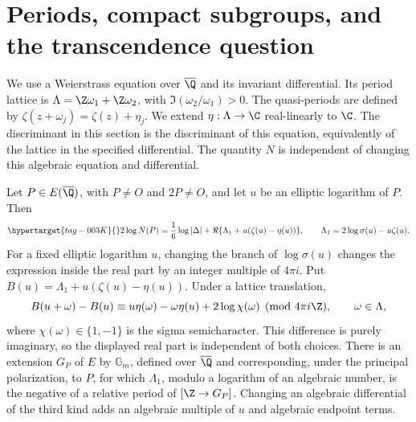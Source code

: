 \section{Periods, compact subgroups, and the transcendence question}

We use a Weierstrass equation over $\overline\Q$ and its invariant
differential. Its period lattice is $\Lambda=\Z\omega_1+\Z\omega_2$,
with $\Im(\omega_2/\omega_1)>0$. The quasi-periods are defined by
$\zeta(z+\omega_j)=\zeta(z)+\eta_j$. We extend
$\eta:\Lambda\to\C$ real-linearly to $\C$. The discriminant in
this section is the discriminant of this equation, equivalently of
the lattice in the specified differential. The quantity $N$ is
independent of changing this algebraic equation and differential.

\begin{proposition}\hypertarget{tag-0017}{}\label{ari:C.7.1}\hypertarget{tag-IA01}{}\label{ari:C.7.1:lift-transport}

Let $P\in E(\overline\Q)$, with $P\ne O$ and $2P\ne O$, and
let $u$ be an elliptic logarithm of $P$. Then
\begin{equation}\hypertarget{tag-003K}{}\label{ari:eq:cp-sigma}
 2\log N(P)=\frac16\log|\Delta|
       +\Re\{\Lambda_1+u(\zeta(u)-\eta(u))\},
 \qquad \Lambda_1=2\log\sigma(u)-u\zeta(u).
\end{equation}
For a fixed elliptic logarithm $u$, changing the branch of
$\log\sigma(u)$ changes the expression inside the real part by an
integer multiple of $4\pi i$. Put
$B(u)=\Lambda_1+u(\zeta(u)-\eta(u))$. Under a lattice translation,
\[
 B(u+\omega)-B(u)\equiv
 u\eta(\omega)-\omega\eta(u)+2\log\chi(\omega)
 \pmod{4\pi i\Z},\qquad \omega\in\Lambda,
\]
where $\chi(\omega)\in\{1,-1\}$ is the sigma semicharacter.
This difference is purely imaginary, so the displayed real part
is independent of both choices.
There is an extension $G_P$ of $E$ by $\mathbb G_m$, defined
over $\overline\Q$ and corresponding, under the principal
polarization, to $P$, for which $\Lambda_1$, modulo a logarithm
of an algebraic number, is the negative of a relative period
of $[\Z\to G_P]$. Changing an algebraic differential of the
third kind adds an algebraic multiple of $u$ and algebraic
endpoint terms.
\end{proposition}


